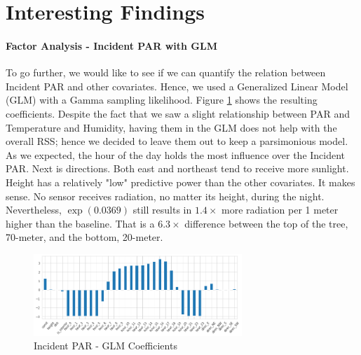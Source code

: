 \documentclass[11pt, letterpaper]{article}
\begin{document}
\section{Interesting Findings}
\paragraph{Factor Analysis - Incident PAR with GLM}
To go further, we would like to see if we can quantify the relation between Incident PAR and other covariates. Hence, we used a Generalized Linear Model (GLM) with a Gamma sampling likelihood. Figure \ref{fig:glm_coef} shows the resulting coefficients. Despite the fact that we saw a slight relationship between PAR and Temperature and Humidity, having them in the GLM does not help with the overall RSS; hence we decided to leave them out to keep a parsimonious model. As we expected, the hour of the day holds the most influence over the Incident PAR. Next is directions. Both east and northeast tend to receive more sunlight. Height has a relatively "low" predictive power than the other covariates. It makes sense. No sensor receives radiation, no matter its height, during the night. Nevertheless, $\exp(0.0369)$ still results in $1.4\times$ more radiation per 1 meter higher than the baseline. That is a $6.3\times$ difference between the top of the tree, 70-meter, and the bottom, 20-meter.
\begin{figure}[h!]
\centering
\includegraphics[width=0.7\textwidth]{eda_3.5.png}
\captionsetup{justification=centering}
\caption{Incident PAR - GLM Coefficients}
\label{fig:glm_coef}
\end{figure}
\end{document}
